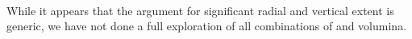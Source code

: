\\While it appears that the argument for significant radial and vertical extent is generic, we have not done a full exploration of all combinations of \pmodel{} and volumina.

%
%
%
%
%
